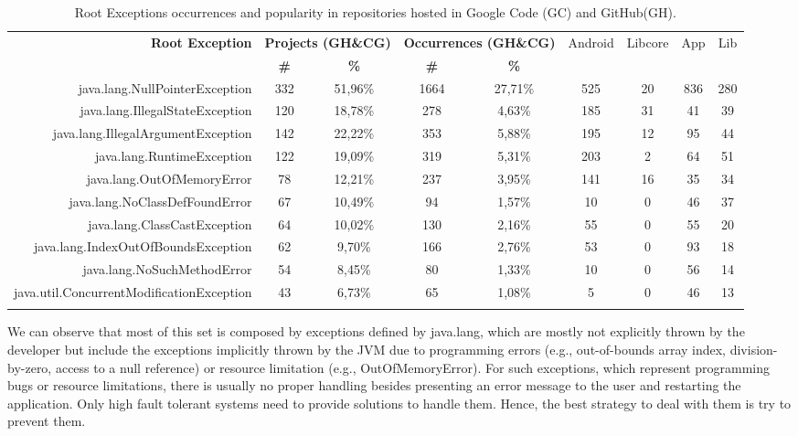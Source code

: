 \documentclass[conference]{IEEEtran}
\begin{document}
\begin{table}
  \centering
  \begin{tabular}{rcccccccc}
    \hline
    \bfseries{Root Exception} &  \multicolumn{2}{c}{\bfseries{Projects (GH\&CG)}} &  \multicolumn{2}{c}{\bfseries{Occurrences (GH\&CG)}} & \textsf{Android} & \textsf{Libcore} & \textsf{App} & \textsf{Lib} \\
    & \bfseries{\#} &  \bfseries{\%} & \bfseries{\# } & \bfseries{\% } &&&&\\
    \hline

java.lang.NullPointerException	&	332	&	51,96\%	&	1664	&	27,71\%	&	525	&	20	&	836	&	280	\\
java.lang.IllegalStateException	&	120	&	18,78\%	&	278	&	4,63\%	&	185	&	31	&	41	&	39	\\
java.lang.IllegalArgumentException	&	142	&	22,22\%	&	353	&	5,88\%	&	195	&	12	&	95	&	44	\\
java.lang.RuntimeException	&	122	&	19,09\%	&	319	&	5,31\%	&	203	&	2	&	64	&	51	\\
java.lang.OutOfMemoryError	&	78	&	12,21\%	&	237	&	3,95\%	&	141	&	16	&	35	&	34	\\
java.lang.NoClassDefFoundError	&	67	&	10,49\%	&	94	&	1,57\%	&	10	&	0	&	46	&	37	\\
java.lang.ClassCastException	&	64	&	10,02\%	&	130	&	2,16\%	&	55	&	0	&	55	&	20	\\
java.lang.IndexOutOfBoundsException	&	62	&	9,70\%	&	166	&	2,76\%	&	53	&	0	&	93	&	18	\\
java.lang.NoSuchMethodError	&	54	&	8,45\%	&	80	&	1,33\%	&	10	&	0	&	56	&	14	\\
java.util.ConcurrentModificationException	&	43	&	6,73\%	&	65	&	1,08\%	&	5	&	0	&	46	&	13	\\
\\

    \hline
  \end{tabular}
\caption{Root Exceptions occurrences and popularity in repositories hosted in Google Code (GC) and GitHub(GH).}
\label{tab:topten}
\end{table}

 

We can observe that most of this set is composed by exceptions defined by java.lang,
which are mostly not explicitly thrown by the developer but include
the exceptions implicitly thrown by the JVM due to programming errors 
(e.g., out-of-bounds array index, division-by-zero, access to a null reference)
 or resource limitation (e.g., OutOfMemoryError).
For such exceptions, which represent programming bugs or resource limitations, 
there is usually no proper handling besides presenting an error message to
 the user and restarting the application. Only high fault tolerant systems need to 
provide solutions to handle them. Hence, the best strategy to deal with them
is try to prevent them.
\end{document}
